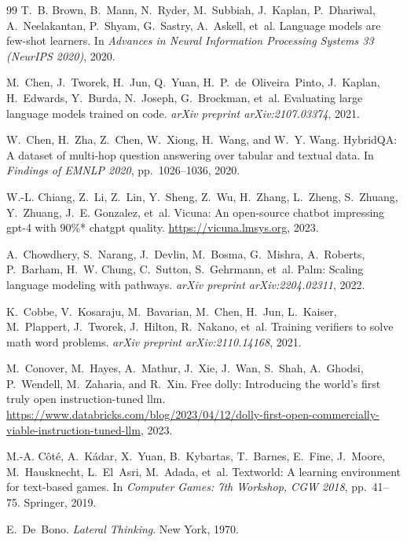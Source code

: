 \begin{thebibliography}{99}
T.~B. Brown, B.~Mann, N.~Ryder, M.~Subbiah, J.~Kaplan, P.~Dhariwal,
A.~Neelakantan, P.~Shyam, G.~Sastry, A.~Askell, et~al.
\newblock Language models are few-shot learners.
\newblock In \emph{Advances in Neural Information Processing Systems 33
(NeurIPS 2020)}, 2020.

M.~Chen, J.~Tworek, H.~Jun, Q.~Yuan, H.~P.~de~Oliveira~Pinto, J.~Kaplan,
H.~Edwards, Y.~Burda, N.~Joseph, G.~Brockman, et~al.
\newblock Evaluating large language models trained on code.
\newblock \emph{arXiv preprint arXiv:2107.03374}, 2021.

W.~Chen, H.~Zha, Z.~Chen, W.~Xiong, H.~Wang, and W.~Y. Wang.
\newblock HybridQA: A dataset of multi-hop question answering over tabular
and textual data.
\newblock In \emph{Findings of EMNLP 2020}, pp.\ 1026--1036, 2020.

W.-L. Chiang, Z.~Li, Z.~Lin, Y.~Sheng, Z.~Wu, H.~Zhang, L.~Zheng,
S.~Zhuang, Y.~Zhuang, J.~E. Gonzalez, et~al.
\newblock Vicuna: An open-source chatbot impressing gpt-4 with 90\%*
chatgpt quality.
\newblock \url{https://vicuna.lmsys.org}, 2023.

A.~Chowdhery, S.~Narang, J.~Devlin, M.~Bosma, G.~Mishra, A.~Roberts,
P.~Barham, H.~W. Chung, C.~Sutton, S.~Gehrmann, et~al.
\newblock Palm: Scaling language modeling with pathways.
\newblock \emph{arXiv preprint arXiv:2204.02311}, 2022.

K.~Cobbe, V.~Kosaraju, M.~Bavarian, M.~Chen, H.~Jun, L.~Kaiser,
M.~Plappert, J.~Tworek, J.~Hilton, R.~Nakano, et~al.
\newblock Training verifiers to solve math word problems.
\newblock \emph{arXiv preprint arXiv:2110.14168}, 2021.

M.~Conover, M.~Hayes, A.~Mathur, J.~Xie, J.~Wan, S.~Shah, A.~Ghodsi,
P.~Wendell, M.~Zaharia, and R.~Xin.
\newblock Free dolly: Introducing the world's first truly open
instruction-tuned llm.
\newblock \url{https://www.databricks.com/blog/2023/04/12/dolly-first-open-commercially-viable-instruction-tuned-llm},
2023.

M.-A. C\^ot\'e, A.~K\'adar, X.~Yuan, B.~Kybartas, T.~Barnes, E.~Fine,
J.~Moore, M.~Hausknecht, L.~El~Asri, M.~Adada, et~al.
\newblock Textworld: A learning environment for text-based games.
\newblock In \emph{Computer Games: 7th Workshop, CGW 2018}, pp.\ 41--75.
Springer, 2019.

E.~De~Bono.
\newblock \emph{Lateral Thinking}.
\newblock New York, 1970.


\end{thebibliography}
